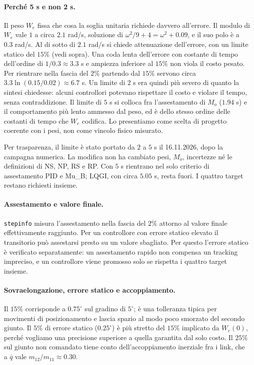 \paragraph{Perché 5 s e non 2 s.} Il peso $W_e$ fissa che cosa la
soglia unitaria richiede davvero all'errore. Il modulo di $W_e$ vale
$1$ a circa $2.1$ rad/s, soluzione di $\omega^2/9+4=\omega^2+0.09$, e
il suo polo è a $0.3$ rad/s. Al di sotto di $2.1$ rad/s si chiede
attenuazione dell'errore, con un limite statico del $15\%$ (vedi
sopra). Una coda lenta dell'errore con costante di tempo dell'ordine
di $1/0.3\approx3.3$ s e ampiezza inferiore al $15\%$ non viola il
costo pesato. Per rientrare nella fascia del $2\%$ partendo dal $15\%$
servono circa $3.3\ln(0.15/0.02)\approx6.7$ s. Un limite di $2$ s era
quindi più severo di quanto la sintesi chiedesse: alcuni controllori
potevano rispettare il costo e violare il tempo, senza contraddizione.
Il limite di $5$ s si colloca fra l'assestamento di $M_o$ ($1.94$ s)
e il comportamento più lento ammesso dal peso, ed è dello stesso ordine
delle costanti di tempo che $W_e$ codifica. Lo presentiamo come scelta
di progetto coerente con i pesi, non come vincolo fisico misurato.

Per trasparenza, il limite è stato portato da $2$ a $5$ s il
16.11.2026, dopo la campagna numerica. La modifica non ha cambiato
pesi, $M_o$, incertezze né le definizioni di NS, NP, RS e RP. Con
$5$ s rientrano nel solo criterio di assestamento PID e Mu\_B;
LQGI, con circa $5.05$ s, resta fuori. I quattro target restano
richiesti insieme.

\paragraph{Assestamento e valore finale.} \texttt{stepinfo} misura
l'assestamento nella fascia del $2\%$ attorno al valore finale
effettivamente raggiunto. Per un controllore con errore statico
elevato il transitorio può assestarsi presto su un valore sbagliato.
Per questo l'errore statico è verificato separatamente: un
assestamento rapido non compensa un tracking impreciso, e un
controllore viene promosso solo se rispetta i quattro target insieme.

\paragraph{Sovraelongazione, errore statico e accoppiamento.} Il
$15\%$ corrisponde a $0.75^\circ$ sul gradino di $5^\circ$; è una
tolleranza tipica per movimenti di posizionamento e lascia spazio al
modo poco smorzato del secondo giunto. Il $5\%$ di errore statico
($0.25^\circ$) è più stretto del $15\%$ implicato da $W_e(0)$, perché
vogliamo una precisione superiore a quella garantita dal solo costo.
Il $25\%$ sul giunto non comandato tiene conto dell'accoppiamento
inerziale fra i link, che a $\bar q$ vale $m_{12}/m_{11}\approx0.30$.

